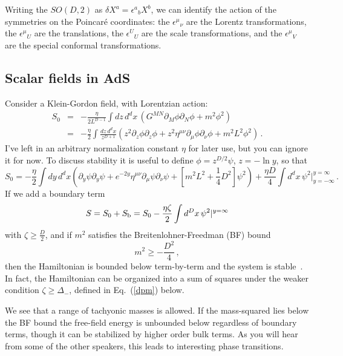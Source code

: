 \documentclass[12pt]{article}
\begin{document}
{Writing the $SO(D,2)$ as $\delta X^a = \epsilon^a\!_b X^b$, we can identify the action of the symmetries on the Poincar\'e coordinates: the $\epsilon^\mu\!_\nu$ are the Lorentz transformations, the  $\epsilon^\mu\!_U$ are the translations, the $\epsilon^U\!_U$ are the scale transformations, and the $\epsilon^\mu\!_V$ are the special conformal transformations.

\subsection{Scalar fields in AdS}

Consider a Klein-Gordon field, with Lorentzian action:
\begin{eqnarray}
S_0 &=& -\frac{\eta}{2L^{D-1}} \int dz\, d^dx\,( G^{MN} \partial_M \phi \partial_N \phi + m^2 \phi^2) 
\nonumber\\
&=&
-\frac{\eta}{2} \int \frac{dz\, d^dx}{z^{D+1}} \left( z^2 \partial_z \phi  \partial_z \phi
+ z^2 \eta^{\mu\nu} \partial_\mu \phi \partial_\nu \phi + m^2 L^2 \phi^2 \right) \,.
\end{eqnarray}
I've left in an arbitrary normalization constant $\eta$ for later use, but you can ignore it for now.
To discuss stability it is useful to define $\phi = z^{D/2}\psi$, $z = -\ln y$, so that
\begin{equation}
S_0 = -\frac{\eta}{2} \int{dy\, d^dx} \left(\partial_y \psi  \partial_y \psi
+ e^{-2y} \eta^{\mu\nu} \partial_\mu \psi \partial_\nu \psi + [m^2 L^2 + {\textstyle \frac14} D^2]  \psi^2 \right)  + \frac{\eta D}{4}  \int{d^dx}\, \psi^2 \Big|^{y = \infty}_{y = -\infty} \,.
\end{equation}
If we add a boundary term
\begin{equation}
S = S_0 + S_{\rm b} =  S_0 - \frac{ \eta\zeta}{2}  \int{d^Dx}\, \psi^2 |^{y = \infty} \label{bact}
\end{equation}
with $\zeta \geq \frac{D}{2}$,  and if $m^2$ satisfies the Breitenlohner-Freedman (BF) bound 
\begin{equation}
m^2 \geq -\frac{D^2}{4} \,,
\end{equation}
then the Hamiltonian is bounded below term-by-term and the system is stable~\cite{Breitenlohner:1982bm}.   In fact, the Hamiltonian can be organized into a sum of squares under the weaker condition $\zeta \geq \Delta_-$, defined in Eq.~(\ref{dpm}) below.

We see that a range of tachyonic masses is allowed.  If the mass-squared lies below the BF bound the free-field energy is unbounded below regardless of boundary terms, though it can be stabilized by higher order bulk terms.  As you will hear from some of the other speakers, this leads to interesting phase transitions.

}
\end{document}
